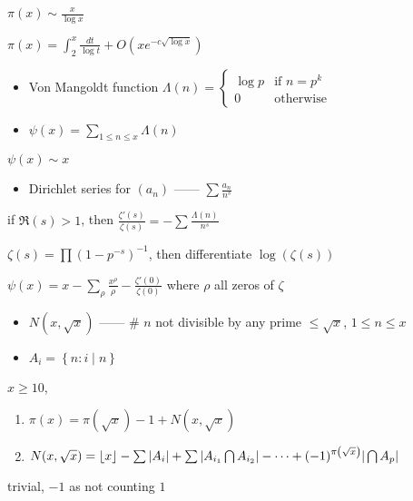 \begin{thm}
    $\pi(x) \sim \frac{x}{\log x}$
\end{thm}

\begin{thm}
    $\pi(x) = \int_2^x \frac{dt}{\log t} + O(xe^{-c\sqrt{\log x}})$
\end{thm}

\begin{itemize}
    \item Von Mangoldt function $\Lambda(n) = \begin{cases}
        \log p & \text{if } n = p^k\\
                                     0 &\text{otherwise}
    \end{cases}$
    \item $\psi(x) = \sum_{1\leq n\leq x} \Lambda(n)$
\end{itemize}

\begin{fact}
    $\psi(x) \sim x$
\end{fact}

\begin{itemize}
    \item Dirichlet series for $(a_n)$ ------ $\sum \frac{a_n}{n^s}$
\end{itemize}
\begin{lemma}
    if $\Re(s) > 1$, then $\frac{\zeta'(s)}{\zeta(s)} = - \sum \frac{\Lambda(n)}{n^s}$
\end{lemma}
\begin{pf}
    $\zeta(s) = \prod(1 - p^{-s})^{-1}$, then differentiate $\log(\zeta(s))$
\end{pf}

\begin{fact}
    $\psi(x) = x - \sum_\rho \frac{x^\rho}{\rho} - \frac{\zeta'(0)}{\zeta(0)}$ where $\rho$ all zeros of $\zeta$
\end{fact}

\begin{itemize}
    \item $N\left(x, \sqrt{x}\right)$ ------ \# $n$ not divisible by any prime $\leq \sqrt{x}$, $1 \leq n \leq x$
    \item $A_i = \left\{ n : i \mid n \right\}$
\end{itemize}

\begin{prop}
    $x \geq 10$,
    \begin{enumerate}
        \item $\pi(x) = \pi(\sqrt{x}) - 1 + N(x, \sqrt{x})$
        \item $N(x, \sqrt{x}) = \lfloor x\rfloor - \sum |A_i| + \sum |A_{i_1}\bigcap A_{i_2}| - \cdots + (-1)^{\pi\left(\sqrt{x}\right)}|\bigcap A_p|$
    \end{enumerate}
\end{prop}
\begin{pf}
    trivial, $-1$ as not counting $1$
\end{pf}

